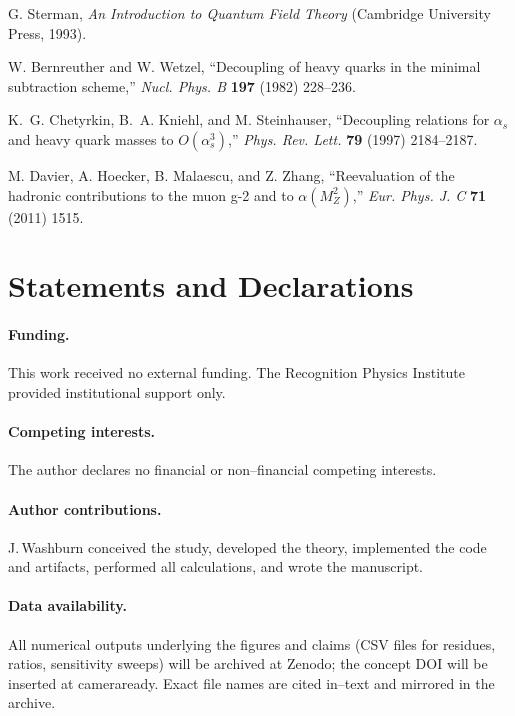 \documentclass[epjc3]{svjour3}
\begin{document}
\begin{thebibliography}{99}
G. Sterman, \emph{An Introduction to Quantum Field Theory} (Cambridge University Press, 1993).

W. Bernreuther and W. Wetzel, ``Decoupling of heavy quarks in the minimal subtraction scheme,'' \emph{Nucl. Phys. B} \textbf{197} (1982) 228–236.

K.~G. Chetyrkin, B.~A. Kniehl, and M. Steinhauser, ``Decoupling relations for $\alpha_s$ and heavy quark masses to $O(\alpha_s^3)$,'' \emph{Phys. Rev. Lett.} \textbf{79} (1997) 2184–2187.

M. Davier, A. Hoecker, B. Malaescu, and Z. Zhang, ``Reevaluation of the hadronic contributions to the muon g-2 and to $\alpha(M_Z^2)$,'' \emph{Eur. Phys. J. C} \textbf{71} (2011) 1515.

\end{thebibliography}

\section*{Statements and Declarations}

\paragraph{Funding.}
This work received no external funding. The Recognition Physics Institute provided institutional support only.

\paragraph{Competing interests.}
The author declares no financial or non\mbox{--}financial competing interests.

\paragraph{Author contributions.}
J.\,Washburn conceived the study, developed the theory, implemented the code and artifacts, performed all calculations, and wrote the manuscript.

\paragraph{Data availability.}
All numerical outputs underlying the figures and claims (CSV files for residues, ratios, sensitivity sweeps) will be archived at Zenodo; the concept DOI will be inserted at camera\-ready. Exact file names are cited in\mbox{--}text and mirrored in the archive.
\end{document}
